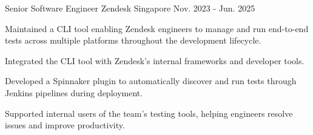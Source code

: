 \begin{cventries}
  \cventry
    {Senior Software Engineer} %
    {Zendesk} %
    {Singapore} %
    {Nov. 2023 - Jun. 2025} %
    {
      \begin{cvitems} %
        \item {Maintained a CLI tool enabling Zendesk engineers to manage and run end-to-end tests across multiple platforms throughout the development lifecycle.}
        \item {Integrated the CLI tool with Zendesk's internal frameworks and developer tools.}
        \item {Developed a Spinnaker plugin to automatically discover and run tests through Jenkins pipelines during deployment.}
        \item {Supported internal users of the team's testing tools, helping engineers resolve issues and improve productivity.}
      \end{cvitems}
    }


\end{cventries}
